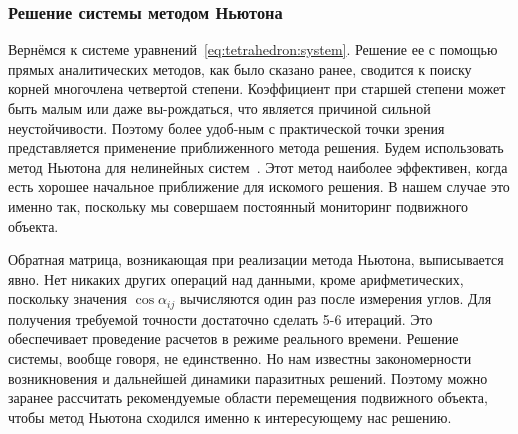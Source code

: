 \documentclass[../main.tex]{subfiles}
\begin{document}
\subsubsection{Решение системы методом Ньютона}
Вернёмся к системе уравнений~\eqref{eq:tetrahedron:system}. Решение ее с помощью прямых аналитических методов, как было сказано ранее, сводится к поиску корней многочлена четвертой степени. Коэффициент при старшей степени может быть малым или даже вы-рождаться, что является причиной сильной неустойчивости. Поэтому более удоб-ным с практической точки зрения представляется применение приближенного метода решения. Будем использовать метод Ньютона для нелинейных систем~\cite[гл.~6]{BAHVALOV:2018}. Этот метод наиболее эффективен, когда есть хорошее начальное приближение для искомого решения. В нашем случае это именно так, поскольку мы совершаем постоянный мониторинг подвижного объекта.

Обратная матрица, возникающая при реализации метода Ньютона, выписывается явно. Нет никаких других операций над данными, кроме арифметических, поскольку значения $\cos \alpha_{ij}$ вычисляются один раз после измерения углов. Для получения требуемой точности достаточно сделать 5-6 итераций. Это обеспечивает проведение расчетов в режиме реального времени. Решение системы, вообще говоря, не единственно. Но нам известны закономерности возникновения и дальнейшей динамики паразитных решений. Поэтому можно заранее рассчитать рекомендуемые области перемещения подвижного объекта, чтобы метод Ньютона сходился именно к интересующему нас решению.
\end{document}
